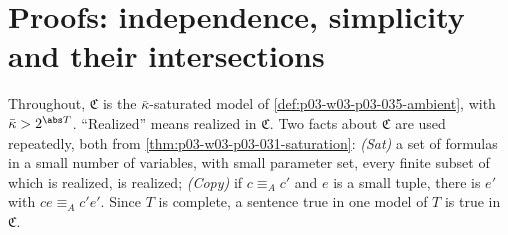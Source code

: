 \section{Proofs: independence, simplicity and their intersections}
\label{sec:annex-p03-w03-p03-035}

Throughout, \(\mathfrak C\) is the \(\bar\kappa\)-saturated model of
\cref{def:p03-w03-p03-035-ambient}, with \(\bar\kappa>2^{\abs T}\).  ``Realized''
means realized in \(\mathfrak C\).  Two facts about \(\mathfrak C\) are used
repeatedly, both from \cref{thm:p03-w03-p03-031-saturation}: \emph{(Sat)} a
set of formulas in a small number of variables, with small parameter set,
every finite subset of which is realized, is realized; \emph{(Copy)} if
\(c\equiv_A c'\) and \(e\) is a small tuple, there is \(e'\) with
\(ce\equiv_A c'e'\).  Since \(T\) is complete, a sentence true in one model of
\(T\) is true in \(\mathfrak C\).

